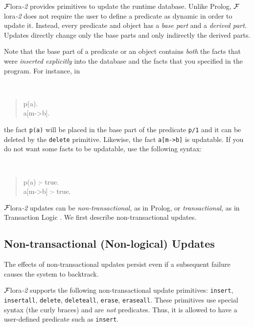 \documentclass[11pt]{article}
\newcommand{\FLORA}{{\mbox{\sc ${\cal F}${lora}\rm\emph{-2}}}\xspace}
\begin{document}
%
\FLORA provides primitives to update the runtime database. Unlike Prolog,
\FLORA does not require the user to define a predicate as dynamic in order
to update it. Instead, every predicate and object
has a \emph{base part} and a \emph{derived part}.  Updates directly change
only the base parts and only indirectly the derived parts.

Note that the base part of a predicate or an object contains \emph{both}
the facts that were \emph{inserted explicitly} into the database and the
facts that you specified in the program. For instance, in
{\tt
\begin{quote}
 p(a).\\
 a[m->b].
\end{quote}
}
\noindent
the fact {\tt p(a)} will be placed in the base part of the
predicate {\tt p/1}  and it can be deleted by the {\tt delete}
primitive. Likewise, the fact {\tt a[m->b]} is updatable. If you do not
want some facts to be updatable, use the following syntax:
{\tt
\begin{quote}
 p(a) :- true.\\
 a[m->b] :- true.
\end{quote}
}


\FLORA updates can be \emph{non-transactional,} as in Prolog, or
\emph{transactional}, as in Transaction Logic
\cite{trans-chapter-98,trans-tcs94}.  We first describe non-transactional
updates.


\subsection{Non-transactional (Non-logical) Updates}
\label{sec:non-transactional-updates}

%
The effects of non-transactional updates persist even if a subsequent failure
causes the system to backtrack.

\FLORA supports the following non-transactional update primitives:
{\tt insert}, {\tt insertall}, {\tt delete}, {\tt deleteall},
{\tt erase}, {\tt eraseall}. These primitives use special syntax (the curly
braces) and are \emph{not} predicates. Thus, it is allowed to have a
user-defined predicate such as {\tt insert}.

%
\end{document}
